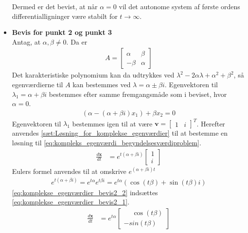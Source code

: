 \begin{bev}
\begin{itemize}
    Dermed er det bevist, at når $\alpha=0$ vil det autonome system af første ordens differentialligninger være stabilt for $t \to \infty$.
    
    \item[] \textbf{Bevis for punkt 2 og punkt 3}\\
    Antag, at $\alpha,\beta \neq 0$. Da er 
    \begin{align*}
        A = \begin{bmatrix}
            \alpha & \beta \\
            -\beta & \alpha
            \end{bmatrix}
    \end{align*}
    Det karakteristiske polynomium kan da udtrykkes ved $\lambda^2-2\alpha\lambda+\alpha^2+\beta^2$, så egenværdierne til $A$ kan bestemmes ved $\lambda = \alpha \pm \beta i$. Egenvektoren til $\lambda_1 = \alpha + \beta i$ bestemmes efter samme fremgangsmåde som i beviset, hvor $\alpha = 0$.
    \begin{align*}
        \left(\alpha-(\alpha + \beta i)x_1\right) + \beta x_2 = 0
    \end{align*}
    Egenvektoren til $\lambda_1$ bestemmes igen til at være $\textbf{v}=\begin{bmatrix} 1 & i\end{bmatrix}^T$. Herefter anvendes \autoref{sæt:Løsning_for_komplekse_egenværdier} til at bestemme en løsning til \eqref{eq:kompleks_egenværdi_begyndelsesværdiproblem}. 
    \begin{align} \label{eq:komplekse_egenværdier_bevis2_1}
        \frac{d\textbf{x}}{dt}&=e^{t(\alpha+\beta i)}\begin{bmatrix}
            1 \\ i
        \end{bmatrix} 
    \end{align}
   Eulers formel anvendes til at omskrive $e^{(\alpha+\beta i)t}$
   \begin{align} \label{eq:komplekse_egenværdier_bevis2_2}
       e^{t(\alpha+\beta i)} = e^{t\alpha}e^{t\beta i }=e^{t\alpha }\left(\cos(t\beta ) + \sin(t\beta)i \right)
   \end{align}
   \eqref{eq:komplekse_egenværdier_bevis2_2} indsættes \eqref{eq:komplekse_egenværdier_bevis2_1}.
   \begin{align*}
       \frac{d\textbf{x}}{dt}&=e^{t\alpha}
       \begin{bmatrix}
           \phantom{-}\cos(t\beta) \\ -sin(t\beta)

\end{bmatrix}
\end{align*}
\end{itemize}
\end{bev}
